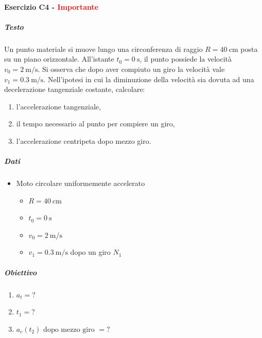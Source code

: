 \documentclass{article}
\begin{document}
\paragraph*{Esercizio C4 - \textcolor{red}{\textbf{Importante}}}
\subparagraph*{Testo}
Un punto materiale si muove lungo una circonferenza di raggio \( R = \SI{40}{\centi\meter} \) posta su un piano orizzontale. All'istante \( t_0 = \SI{0}{\second} \), il punto possiede la velocità \( v_0 = \SI{2}{\meter\per\second} \). Si osserva che dopo aver compiuto un giro la velocità vale \( v_1 = \SI{0.3}{\meter\per\second} \). Nell'ipotesi in cui la diminuzione della velocità sia dovuta ad una decelerazione tangenziale costante, calcolare:
\begin{enumerate}[label=\alph*)]
    \item l'accelerazione tangenziale,
    \item il tempo necessario al punto per compiere un giro,
    \item l'accelerazione centripeta dopo mezzo giro.
\end{enumerate}
\subparagraph*{Dati}
\begin{itemize}
    \item Moto circolare uniformemente accelerato
          \begin{itemize}
              \item $R = \SI{40}{\centi\meter}$
              \item $t_0 = \SI{0}{\second}$
              \item $v_0 = \SI{2}{\meter\per\second}$
              \item $v_1 = \SI{0.3}{\meter\per\second}$ dopo un giro $N_1$
          \end{itemize}
\end{itemize}
\subparagraph*{Obiettivo}
\begin{enumerate}[label=\alph*)]
    \item $a_t = ?$
    \item $t_1 = ?$
    \item $a_c(t_2) \text{ dopo mezzo giro } = ?$
\end{enumerate}
\end{document}
